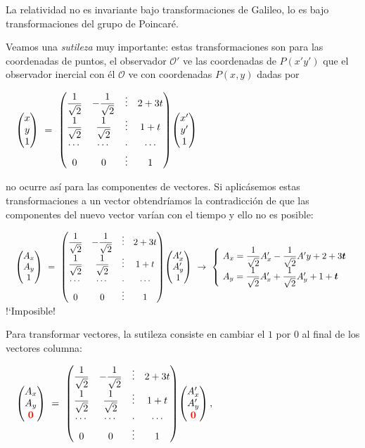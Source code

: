 La relatividad no es invariante bajo transformaciones de Galileo, lo es bajo transformaciones del grupo de Poincaré.

\vspace{5mm}

Veamos una \emph{sutileza} muy importante: estas transformaciones son para las coordenadas de puntos, el observador $\mathcal O'$ ve las coordenadas de $P(x'y')$ que el observador inercial con él $\mathcal O$ ve con coordenadas $P(x,y)$ dadas por

 $\quad \mqty(x\\y\\1) \ = \ \mqty(
 \dfrac 1{\sqrt{2}} &  -\dfrac 1{\sqrt{2}} & \vdots & 2+3t \\
  \dfrac 1{\sqrt{2}}&   \dfrac 1{\sqrt{2}} & \vdots & 1+t \\
  \cdots & \cdots & \cdot & \cdots \\
  0&0&\vdots &1
 ) \mqty(x'\\y'\\1)$

no ocurre así para las componentes de vectores. Si aplicásemos estas transformaciones a un vector obtendríamos la contradicción de que las componentes del nuevo vector varían con el tiempo y ello no es posible:

  $\quad \mqty(A_x\\A_y\\1) \ = \ \mqty(
 \dfrac 1{\sqrt{2}} &  -\dfrac 1{\sqrt{2}} & \vdots & 2+3t \\
  \dfrac 1{\sqrt{2}}&   \dfrac 1{\sqrt{2}} & \vdots & 1+t \\
  \cdots & \cdots & \cdot & \cdots \\
  0&0&\vdots &1
 ) \mqty(A'_x\\A'_y\\1) \ \to \ \begin{cases}
 \ A_x = \dfrac 1{\sqrt{2}} 	A'_x - \dfrac 1 {\sqrt{2}} A'y +2+3\boldsymbol{t} \\ 
 \ A_y=  \dfrac 1 {\sqrt{2}} A'_x + \dfrac 1 {\sqrt{2}} A'_y+ 1+\boldsymbol{t} 
 \end{cases}\ $ !`Imposible! 
 
 Para transformar vectores, la sutileza consiste en cambiar el $1$ por $0$ al final de los vectores columna:
 
  $\quad \mqty(A_x\\A_y\\ \boldsymbol{\textcolor{red}{0}}) \ = \ \mqty(
 \dfrac 1{\sqrt{2}} &  -\dfrac 1{\sqrt{2}} & \vdots & 2+3t \\
  \dfrac 1{\sqrt{2}}&   \dfrac 1{\sqrt{2}} & \vdots & 1+t \\
  \cdots & \cdots & \cdot & \cdots \\
  0&0&\vdots &1) \mqty(A'_x\\A'_y\\ \boldsymbol{\textcolor{red}{0}})\, , \ $ 
  
